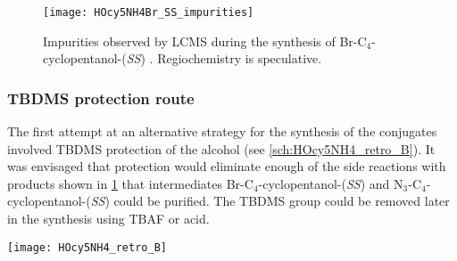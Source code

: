 \begin{figure}[H]
	\begin{center}
		\texttt{[image: HOcy5NH4Br\_SS\_impurities]}
		\caption{Impurities observed by LCMS during the synthesis of Br-C$_4$-cyclopentanol-(\textit{SS}) .
		Regiochemistry is speculative.
		\label{fig:HOcy5NH4Br_SS_impurities}}
	\end{center}
\end{figure}

\subsubsection{TBDMS protection route \label{sec:TBDMS}}

The first attempt at an alternative strategy for the synthesis of the conjugates involved TBDMS protection of the alcohol (see \ref{sch:HOcy5NH4_retro_B}). It was envisaged that protection would eliminate enough of the side reactions with products shown in \ref{fig:HOcy5NH4Br_SS_impurities} that intermediates Br-C$_4$-cyclopentanol-(\textit{SS})  and N$_3$-C$_4$-cyclopentanol-(\textit{SS})  could be purified. The TBDMS group could be removed later in the synthesis using TBAF or acid.

\begin{scheme}[H]
	\begin{center}
		\texttt{[image: HOcy5NH4\_retro\_B]}
		\caption{Retrosynthesis of the cyclopentanol-CipMe conjugates 
		 (\textit{SS}) and   (\textit{RR}), 
		and the cyclopentanol-Cip triazole conjugates 
		 (\textit{SS}) and
		 (\textit{RR}) 
		using a TBDMS protection strategy. \textit{SS} enantiomers are shown, but both will be synthesised.\label{sch:HOcy5NH4_retro_B}}
	\end{center}
\end{scheme}

